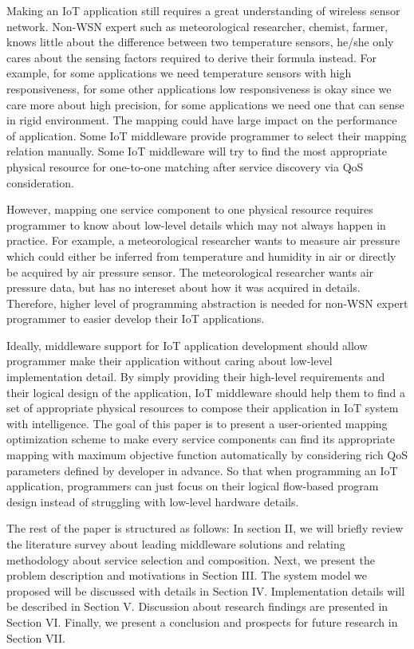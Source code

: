 

Making an IoT application still requires a great understanding of wireless sensor network. Non-WSN expert such as meteorological researcher, chemist, farmer, knows little about the difference between two temperature sensors, he/she only cares about the sensing factors required to derive their formula instead. For example, for some applications we need temperature sensors with high responsiveness, for some other applications low responsiveness is okay since we care more about high precision, for some applications we need one that can sense in rigid environment. The mapping could have large impact on the performance of application. Some IoT middleware provide programmer to select their mapping relation manually. Some IoT middleware will try to find the most appropriate physical resource for one-to-one matching after service discovery via QoS consideration. 

However, mapping one service component to one physical resource requires programmer to know about low-level details which may not always happen in practice. For example, a meteorological researcher wants to measure air pressure which could either be inferred from temperature and humidity in air or directly be acquired by air pressure sensor. The meteorological researcher wants air pressure data, but has no intereset about how it was acquired in details. Therefore, higher level of programming abstraction is needed for non-WSN expert programmer to easier develop their IoT applications. 



Ideally, middleware support for IoT application development should allow programmer make their application without caring about low-level implementation detail. By simply providing their high-level requirements and their logical design of the application, IoT middleware should help them to find a set of appropriate physical resources to compose their application in IoT system with intelligence. The goal of this paper is to present a user-oriented mapping optimization scheme to make every service components can find its appropriate mapping with maximum objective function automatically by considering rich QoS parameters defined by developer in advance. So that when programming an IoT application, programmers can just focus on their logical flow-based program design instead of struggling with low-level hardware details. 

The rest of the paper is structured as follows: In section II, we will briefly review the literature survey about leading middleware solutions and relating methodology about service selection and composition. Next, we present the problem description and motivations in Section III. The system model we proposed will be discussed with details in Section IV. Implementation details will be described in Section V. Discussion about research findings are presented in Section VI. Finally, we present a conclusion and prospects for future research in Section VII.
